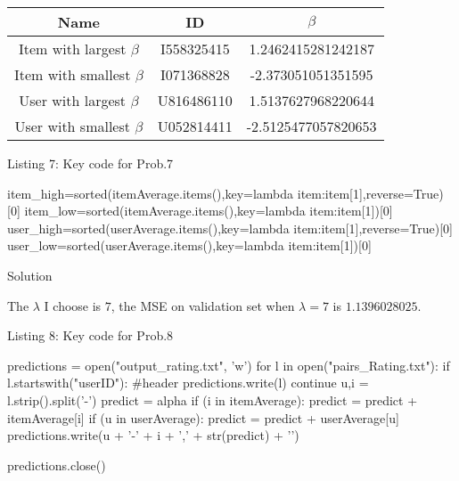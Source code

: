 \documentclass{assignment}
\begin{document}
\begin{problemlist}
\begin{table}[h]
\begin{tabular}{|c|c|c|}
\hline
Name & ID & $\beta$ \\
\hline
Item with largest $\beta$ & I558325415 &1.2462415281242187\\
\hline
Item with smallest $\beta$ & I071368828 &  -2.373051051351595 \\
\hline
User with largest $\beta$ & U816486110 & 1.5137627968220644 \\
\hline
User with smallest $\beta$ & U052814411 & -2.5125477057820653 \\
\hline
\end{tabular}
\end{table}

\begin{center} 
Listing 7: Key code for Prob.7
\end{center}
\begin{python}
item_high=sorted(itemAverage.items(),key=lambda item:item[1],reverse=True)[0]
item_low=sorted(itemAverage.items(),key=lambda item:item[1])[0]
user_high=sorted(userAverage.items(),key=lambda item:item[1],reverse=True)[0]
user_low=sorted(userAverage.items(),key=lambda item:item[1])[0]
\end{python}

\pbitem Solution
\vspace{2ex}

The $\lambda$ I choose is $7$, the MSE on validation set when $\lambda=7$ is $1.1396028025$.

\begin{center} 
Listing 8: Key code for Prob.8
\end{center}
\begin{python}
predictions = open("output_rating.txt", 'w')
for l in open("pairs_Rating.txt"):
  if l.startswith("userID"):
    #header
    predictions.write(l)
    continue
  u,i = l.strip().split('-')
  predict = alpha
  if (i in itemAverage):
      predict = predict + itemAverage[i]
  if (u in userAverage):
      predict = predict + userAverage[u]
  predictions.write(u + '-' + i + ',' + str(predict) + '\n')

predictions.close()
\end{python}


\end{problemlist}
\end{document}

